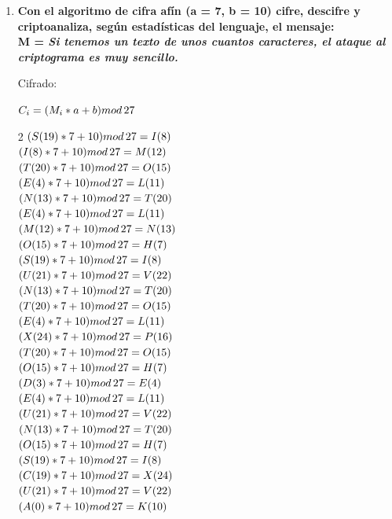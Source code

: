 \documentclass{article}
\begin{document}
\begin{enumerate}
\item \textbf{Con el algoritmo de cifra afín (a = 7, b = 10) cifre, descifre y criptoanaliza, según estadísticas del lenguaje, el mensaje: \\ M =\emph{ Si tenemos un texto de unos cuantos caracteres, el ataque al criptograma es muy sencillo.}} 

 Cifrado: 
 
  $C_i=(M_i*a+b) mod \thinspace 27$
 

 \begin{multicols}{2} 
 $(S(19)*7+10)mod \thinspace 27 = I (8)$\\
 $(I(8)*7+10)mod \thinspace 27 = M (12)$\\
 $(T(20)*7+10)mod \thinspace 27 = O (15)$\\
 $(E(4)*7+10)mod \thinspace 27 = L (11)$\\
 $(N(13)*7+10)mod \thinspace 27 = T (20)$\\
 $(E(4)*7+10)mod \thinspace 27 = L (11)$\\
 $(M(12)*7+10)mod \thinspace 27 = N (13)$\\
 $(O(15)*7+10)mod \thinspace 27 = H (7)$\\
 $(S(19)*7+10)mod \thinspace 27 = I (8)$\\
 $(U(21)*7+10)mod \thinspace 27 = V (22)$\\
 $(N(13)*7+10)mod \thinspace 27 = T (20)$\\
 $(T(20)*7+10)mod \thinspace 27 = O (15)$\\
 $(E(4)*7+10)mod \thinspace 27 = L (11)$\\
 $(X(24)*7+10)mod \thinspace 27 = P (16)$\\
 $(T(20)*7+10)mod \thinspace 27 = O (15)$\\
 $(O(15)*7+10)mod \thinspace 27 = H (7)$\\
 $(D(3)*7+10)mod \thinspace 27 = E (4)$\\
 $(E(4)*7+10)mod \thinspace 27 = L (11)$\\
 $(U(21)*7+10)mod \thinspace 27 = V (22)$\\
 $(N(13)*7+10)mod \thinspace 27 = T (20)$\\
 $(O(15)*7+10)mod \thinspace 27 = H (7)$\\
 $(S(19)*7+10)mod \thinspace 27 = I (8)$\\
 $(C(19)*7+10)mod \thinspace 27 = X (24)$\\
 $(U(21)*7+10)mod \thinspace 27 = V (22)$\\
 $(A(0)*7+10)mod \thinspace 27 = K (10)$\\

\end{multicols}
\end{enumerate}
\end{document}
